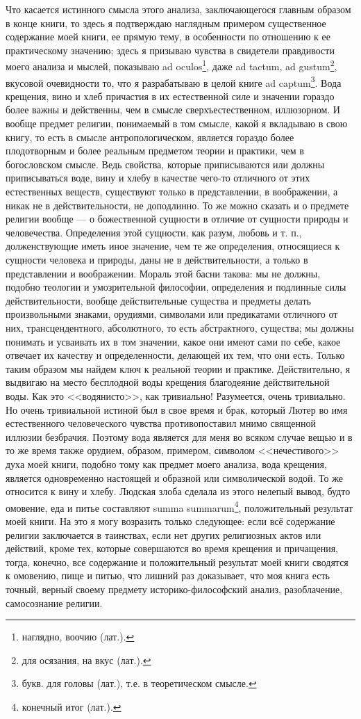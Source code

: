 \documentclass[12pt,oneside]{book}
\begin{document}
Что касается истинного смысла этого анализа, заключающегося главным образом в конце книги, то здесь я подтверждаю наглядным примером существенное содержание моей книги, ее прямую тему, в особенности по отношению к ее практическому значению; здесь я призываю чувства в свидетели правдивости моего анализа и мыслей, показываю 
ad oculos\footnote{наглядно, воочию (лат.).}, даже ad tactum, ad gustum\footnote{для осязания, на вкус (лат.).}, вкусовой очевидности то, что я разрабатываю в целой книге ad captum\footnote{букв. для головы (лат.), т.е. в теоретическом смысле.}. Вода крещения, вино и хлеб причастия в их естественной силе и значении гораздо более важны и действенны, чем в смысле сверхъестественном, иллюзорном. И вообще предмет религии, понимаемый в том смысле, какой я вкладываю в свою книгу, то есть в смысле антропологическом, является гораздо более плодотворным и более реальным предметом теории и практики, чем в богословском смысле. Ведь свойства, которые приписываются или должны приписываться воде, вину и хлебу в качестве чего-то отличного от этих естественных веществ, существуют только в представлении, в воображении, а никак не в действительности, не доподлинно. То же можно сказать и о предмете религии вообще --- о божественной сущности в отличие от сущности природы и человечества. Определения этой сущности, как разум, любовь и т. п., долженствующие иметь иное значение, чем те же определения, относящиеся к сущности человека и природы, даны не в действительности, а только в представлении и воображении. Мораль этой басни такова: мы не должны, подобно теологии и умозрительной философии, определения и подлинные силы действительности, вообще действительные существа и предметы делать произвольными знаками, орудиями, символами или предикатами отличного от них, трансцендентного, абсолютного, то есть абстрактного, существа; мы должны понимать и усваивать их в том значении, какое они имеют сами по себе, какое отвечает их качеству и определенности, делающей их тем, что они есть. Только таким образом мы найдем ключ к реальной теории и практике. Действительно, я выдвигаю на место бесплодной воды крещения благодеяние действительной воды. Как это <<водянисто>>, как тривиально! Разумеется, очень тривиально. Но очень тривиальной истиной был в свое время и брак, который Лютер во имя естественного человеческого чувства противопоставил мнимо священной иллюзии безбрачия. Поэтому вода является для меня во всяком случае вещью и в то же время также орудием, образом, примером, символом <<нечестивого>> духа моей книги, подобно тому как предмет моего анализа, вода крещения, является одновременно настоящей и образной или символической водой. То же относится к вину и хлебу. Людская злоба сделала из этого нелепый вывод, будто омовение, еда и питье составляют summa summarum\footnote{конечный итог (лат.).}, положительный результат моей книги. На это я могу возразить только следующее: если всё содержание религии заключается в таинствах, если нет других религиозных актов или действий, кроме тех, которые совершаются во время крещения и причащения, тогда, конечно, все содержание и положительный результат моей книги сводятся к омовению, пище и питью, что лишний раз доказывает, что моя книга есть точный, верный своему предмету историко-философский анализ, разоблачение, самосознание религии.
\end{document}
